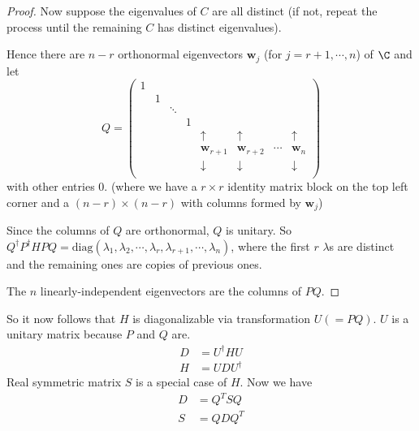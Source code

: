 \documentclass[a4paper]{article}
\begin{document}
\begin{proof}
    Now suppose the eigenvalues of $C$ are all distinct (if not, repeat the process until the remaining $C$ has distinct eigenvalues).

    Hence there are $n -r $ orthonormal eigenvectors $\mathbf{w}_j$ (for $j = r + 1, \cdots, n$) of $\C$ and let
    \[
      Q = 
      \begin{pmatrix}
        1 \\
        & 1\\
        && \ddots\\
        &&& 1\\
        &&&& \uparrow & \uparrow & &\uparrow\\
        &&&& \mathbf{w}_{r+1} & \mathbf{w}_{r + 2} & \cdots & \mathbf{w}_n\\
        &&&& \downarrow & \downarrow & &\downarrow\\
      \end{pmatrix}
    \]
    with other entries $0$. (where we have a $r\times r$ identity matrix block on the top left corner and a $(n - r) \times (n -r)$ with columns formed by $\mathbf{w}_j$)

    Since the columns of $Q$ are orthonormal, $Q$ is unitary. So $Q^\dagger P^\dagger HPQ = \mathrm{diag}(\lambda_1, \lambda_2, \cdots, \lambda_r, \lambda_{r + 1}, \cdots, \lambda_n)$, where the first $r$ $\lambda$s are distinct and the remaining ones are copies of previous ones.

    The $n$ linearly-independent eigenvectors are the columns of $PQ$.

  \end{proof}
  So it now follows that $H$ is diagonalizable via transformation $U (=PQ)$. $U$ is a unitary matrix because $P$ and $Q$ are.
  \begin{align*}
    D &= U^\dagger HU\\
    H &= UDU^\dagger
  \end{align*}
  Real symmetric matrix $S$ is a special case of $H$. Now we have
  \begin{align*}
    D &= Q^T SQ\\
    S &= QDQ^T
  \end{align*}
\end{document}
